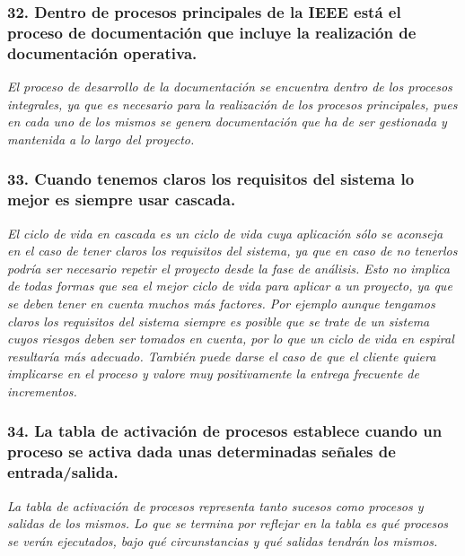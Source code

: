 \subsubsection*{32. Dentro de procesos principales de la IEEE está el proceso de documentación que incluye la realización de documentación operativa.} %
\textit{El proceso de desarrollo de la documentación se encuentra dentro de los procesos integrales, ya que es necesario para la realización de los procesos principales, pues en cada uno de los mismos se genera documentación que ha de ser gestionada y mantenida a lo largo del proyecto.}


\subsubsection*{33. Cuando tenemos claros los requisitos del sistema lo mejor es siempre usar cascada.} %
\textit{El ciclo de vida en cascada es un ciclo de vida cuya aplicación sólo se aconseja en el caso de tener claros los requisitos del sistema, ya que en caso de no tenerlos podría ser necesario repetir el proyecto desde la fase de análisis. Esto no implica de todas formas que sea el mejor ciclo de vida para aplicar a un proyecto, ya que se deben tener en cuenta muchos más factores. Por ejemplo aunque tengamos claros los requisitos del sistema siempre es posible que se trate de un sistema cuyos riesgos deben ser tomados en cuenta, por lo que un ciclo de vida en espiral resultaría más adecuado. También puede darse el caso de que el cliente quiera implicarse en el proceso y valore muy positivamente la entrega frecuente de incrementos.} 

\subsubsection*{34. La tabla de activación de procesos establece cuando un proceso se activa dada unas determinadas señales de entrada/salida.} %
\textit{La tabla de activación de procesos representa tanto sucesos como procesos y salidas de los mismos. Lo que se termina por reflejar en la tabla es qué procesos se verán ejecutados, bajo qué circunstancias y qué salidas tendrán los mismos.}

